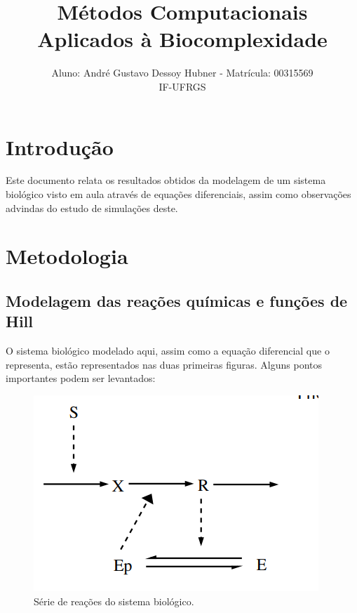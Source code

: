 \documentclass[brazilian,12pt,a4paper,final]{article}
\title{Métodos Computacionais Aplicados à Biocomplexidade}
\author{Aluno: André Gustavo Dessoy Hubner - Matrícula: 00315569 \\ IF-UFRGS}
\begin{document}
	\maketitle
	
	\section{Introdu\c{c}\~ao} 
	\indent 
	Este documento relata os resultados obtidos da modelagem de um sistema biológico visto em aula através de equações diferenciais, assim como observações advindas do estudo de simulações deste.
	
	\section{Metodologia}
	\subsection{Modelagem das reações químicas e funções de Hill}
	O sistema biológico modelado aqui, assim como a equação diferencial que o representa, estão representados nas duas primeiras figuras. Alguns pontos importantes podem ser levantados:
	
	\begin{figure}[hbtp]
		\begin{center}
			\includegraphics[]{Reações.png}
			\caption{Série de reações do sistema biológico.}
			\label{fig}
		\end{center}
	\end{figure}
	
\end{document}
